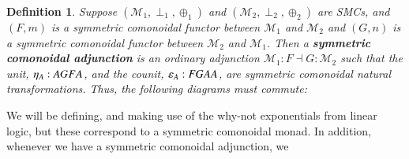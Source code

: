 \documentclass{lmcs}
\newtheorem{definition}[theorem]{Definition}
\let\to\relax
\newcommand{\to}{\rightarrow}
\newcommand{\cat}[1]{\mathcal{#1}}
\newcommand{\p}[1]{\mathsf{p}_{#1}}
\newcommand{\q}[1]{\mathsf{q}_{#1}}
\begin{document}
\begin{definition}
  \label{def:coSMCADJ}
  Suppose $(\cat{M}_1,\perp_1,\oplus_1)$ and $(\cat{M}_2,\perp_2,\oplus_2)$
  are SMCs, and $(F,m)$ is a symmetric comonoidal functor between
  $\cat{M}_1$ and $\cat{M}_2$ and $(G,n)$ is a symmetric comonoidal
  functor between $\cat{M}_2$ and $\cat{M}_1$.  Then a
  \textbf{symmetric comonoidal adjunction} is an ordinary adjunction
  $\cat{M}_1 : F \dashv G : \cat{M}_2$ such that the unit,
  $\eta_A : A \to GFA$, and the counit, $\varepsilon_A : FGA \to A$, are
  symmetric comonoidal natural transformations.  Thus, the following
  diagrams must commute:
\end{definition}
We will be defining, and making use of the why-not exponentials from
linear logic, but these correspond to a symmetric comonoidal monad.
In addition, whenever we have a symmetric comonoidal adjunction, we
\end{document}
